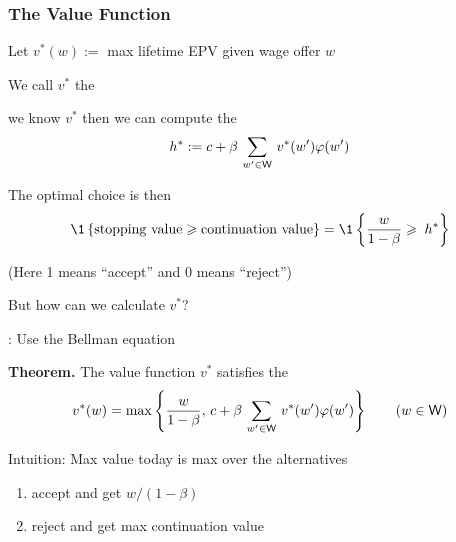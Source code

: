 \begin{frame}
    \frametitle{The Value Function}

    Let  $v^*(w) :=$ max lifetime EPV given wage offer $w$
    \vspace{0.4em}

    We call $v^*$ the 
    \vspace{0.4em}

     we know $v^*$ then we can compute the  
    \begin{equation*}
        h^* 
        := c + \beta \, \sum_{w' \in \mathsf W} \, v^*(w') \varphi(w') 
    \end{equation*}

    The optimal choice is then
    \begin{equation*}
         \1
        \left\{
            \text{stopping value} \geq \text{continuation value}
        \right\}
         = \1
        \left\{
            \frac{w}{1 - \beta} \geq \; h^*
        \right\}
    \end{equation*}


    (Here 1 means ``accept'' and 0 means ``reject'')

\end{frame}


\begin{frame}

    But how can we calculate $v^*$?

    \vspace{0.4em}
    : Use the Bellman equation 

    \vspace{0.4em}
    {\bf Theorem.} The value function $v^*$ satisfies the 
    \begin{equation*}
        v^*(w) = 
        \max \left\{
            \frac{w}{1-\beta}
            ,\,
            c + \beta \, \sum_{w' \in \mathsf W} \, v^*(w') \varphi(w')
            \right\}
            \qquad (w \in \mathsf W)
    \end{equation*}

    \vspace{0.4em}
    \vspace{0.4em}
    \vspace{0.4em}
    Intuition: Max value today is max over the alternatives
    \begin{enumerate}
        \item accept and get $w/(1-\beta)$
        \vspace{0.4em}
        \item reject and get max continuation value
    \end{enumerate}


\end{frame}


